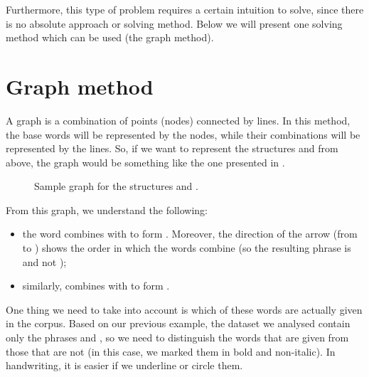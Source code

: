 \begin{refsection}
Furthermore, this type of problem requires a certain intuition to solve, since there is no absolute approach or solving method. Below we will present one solving method which can be used (the graph method).

\section{Graph method}
A graph is a combination of points (nodes) connected by lines. In this method, the base words will be represented by the nodes, while their combinations will be represented by the lines. So, if we want to represent the structures  and  from above, the graph would be something like the one presented in .

\begin{figure}[ht]
  \caption{Sample graph for the structures  and .}
  \label{fig:CPE-short-graph}
\end{figure}


 From this graph, we understand the following:
\begin{itemize}
    \item the word  combines with  to form . Moreover, the direction of the arrow (from  to ) shows the order in which the words combine (so the resulting phrase is  and not );
    \item similarly,  combines with  to form .
\end{itemize}

One thing we need to take into account is which of these words are actually given in the corpus. Based on our previous example, the dataset we analysed contain only the phrases  and , so we need to distinguish the words that are given from those that are not (in this case, we marked them in bold and non-italic). In handwriting, it is easier if we underline or circle them.


\end{refsection}

